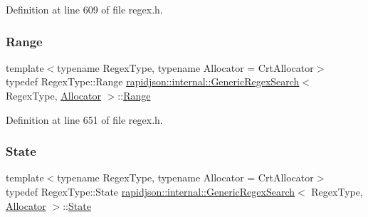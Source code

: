 Definition at line 609 of file regex.\+h.

\mbox{\label{classrapidjson_1_1internal_1_1_generic_regex_search_a3bb3ee12c042b2266885a07226e3d6be}} 
\subsubsection{\texorpdfstring{Range}{Range}}
{\footnotesize\ttfamily template$<$typename Regex\+Type, typename Allocator = Crt\+Allocator$>$ \\
typedef Regex\+Type\+::\+Range \mbox{\hyperlink{classrapidjson_1_1internal_1_1_generic_regex_search}{rapidjson\+::internal\+::\+Generic\+Regex\+Search}}$<$ Regex\+Type, \mbox{\hyperlink{classrapidjson_1_1_allocator}{Allocator}} $>$\+::\mbox{\hyperlink{classrapidjson_1_1internal_1_1_generic_regex_search_a3bb3ee12c042b2266885a07226e3d6be}{Range}}\hspace{0.3cm}{\ttfamily [private]}}



Definition at line 651 of file regex.\+h.

\mbox{\label{classrapidjson_1_1internal_1_1_generic_regex_search_a81ada00d83141d17b9aba7c2caa48353}} 
\subsubsection{\texorpdfstring{State}{State}}
{\footnotesize\ttfamily template$<$typename Regex\+Type, typename Allocator = Crt\+Allocator$>$ \\
typedef Regex\+Type\+::\+State \mbox{\hyperlink{classrapidjson_1_1internal_1_1_generic_regex_search}{rapidjson\+::internal\+::\+Generic\+Regex\+Search}}$<$ Regex\+Type, \mbox{\hyperlink{classrapidjson_1_1_allocator}{Allocator}} $>$\+::\mbox{\hyperlink{classrapidjson_1_1internal_1_1_generic_regex_search_a81ada00d83141d17b9aba7c2caa48353}{State}}\hspace{0.3cm}{\ttfamily [private]}}



